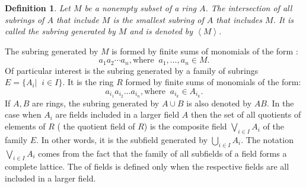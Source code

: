 \documentclass[12pt]{article}
\newtheorem{defn*}{Definition}
\def\genby#1{{\left\langle #1\right\rangle}}
\begin{document}
\begin{defn*} Let $M$ be a nonempty subset of a ring $A$. The intersection of all subrings of $A$ that include $M$ is the smallest subring of $A$ that includes $M$. It is called the \em{subring generated by} $M$ and is denoted by $\genby{M}$.\end{defn*}
 The subring generated by $M$ is formed by finite sums of monomials of the form :\begin{equation*}
a_1a_2 \cdots a_n, \mbox{where} \;\;\displaystyle a_1,\ldots , a_n \in M.\end{equation*}
 Of particular interest is the subring generated by a family of subrings $E = \{A_i|\;\; i\in I\}$. It is the ring $R$ formed by finite sums of monomials of the form:\begin{equation*}
\displaystyle a_{i_1}a_{i_2} \ldots a_{i_n}, \mbox{where}\;\; a_{i_k} \in A_{i_k}. \end{equation*}
  If $A,B$ are rings, the subring generated by $A \cup B$ is also denoted by $AB$.\newline
 In the case when $A_i$ are fields included in a larger field $A$ then the set of all quotients of elements of $R$ ( the quotient field of $R$) is the composite field $\bigvee_{i\in I}A_i$ of the family $E$. In other words, it is the subfield generated by $\bigcup_{i\in I}A_i$. The notation $\bigvee_{i\in I}A_i$  comes from the fact that the family of all subfields of a field forms a complete lattice.\newline
 The  of fields is defined only when the respective fields are all included in a larger field. 
 

\end{document}

